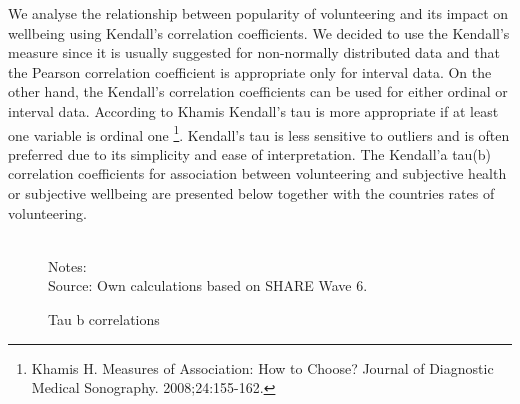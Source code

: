 \documentclass[10pt, letterpaper]{article}
\begin{document}
\begin{spacing}{1.4}
We analyse the relationship between popularity of volunteering and its impact on wellbeing using Kendall's correlation coefficients. We decided to use the Kendall's measure since it is usually suggested for non-normally distributed data and that the Pearson correlation coefficient is appropriate only for interval data. On the other hand, the Kendall's correlation coefficients can be used for either ordinal or interval data. According to Khamis  Kendall's tau is more appropriate if at least one variable is ordinal one \footnote{Khamis H. Measures of Association: How to Choose? Journal of Diagnostic Medical Sonography. 2008;24:155-162.}. Kendall's tau is less sensitive to outliers and is often preferred due to its simplicity and ease of interpretation. The Kendall'a tau(b) correlation coefficients for association between volunteering and subjective health or subjective wellbeing  are presented below together with the countries rates of volunteering.


\begin{figure}[H]
\centering
\caption{Tau b correlations} 
\label{fig:taub}
\begin{minipage}{1\linewidth}
\quad
{}~\\
{\footnotesize Notes: }~\\
{\footnotesize Source: Own calculations based on SHARE Wave 6.}
\end{minipage}
\end{figure} 


\end{spacing}
\end{document}
